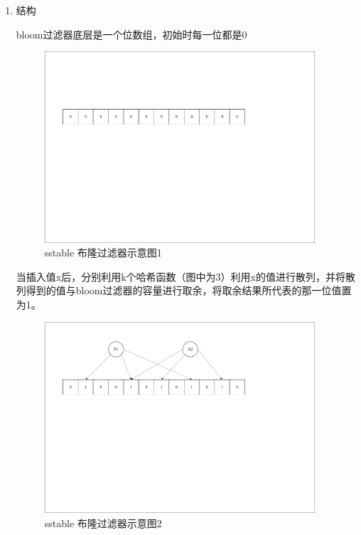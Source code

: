 		\begin{enumerate}
			\item 结构 
			
			bloom过滤器底层是一个位数组，初始时每一位都是0 

			\begin{figure}[H]
				\centering
				\includegraphics[width=0.95\textwidth]{pdf/bloom1.pdf}
				\caption{sstable 布隆过滤器示意图1}
				\label{sstable_bloom1}
			\end{figure}
			

当插入值x后，分别利用k个哈希函数（图中为3）利用x的值进行散列，并将散列得到的值与bloom过滤器的容量进行取余，将取余结果所代表的那一位值置为1。

\begin{figure}[H]
	\centering
	\includegraphics[width=0.95\textwidth]{pdf/bloom2.pdf}
	\caption{sstable 布隆过滤器示意图2}
	\label{sstable_bloom2}
\end{figure}


\end{enumerate}
